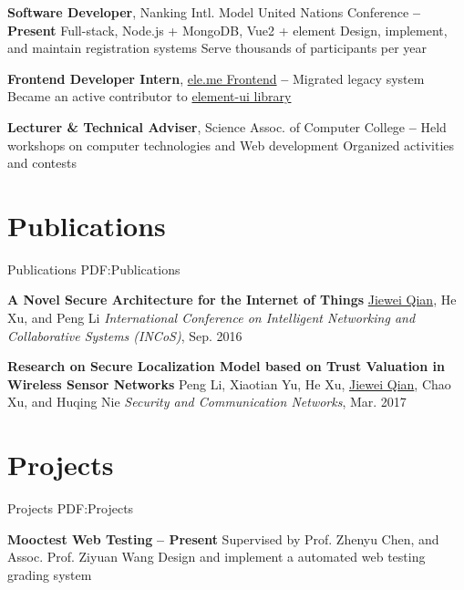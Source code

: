 \documentclass[a4paper,MMMyyyy,nonstop]{simpleresumecv}
\begin{document}
\begin{body}
\textbf{Software Developer}, Nanking Intl. Model United Nations Conference
\hfill \textbf{
      -- Present
}
\SubItem
Full-stack, Node.js + MongoDB, Vue2 + element
\SubItem
Design, implement, and maintain registration systems
\SubItem
Serve thousands of participants per year

\GapNoBreak

\textbf{Frontend Developer Intern}, \href{https://zhuanlan.zhihu.com/ElemeFE}{ele.me Frontend}
\hfill \textbf{
     -- 
}
\SubItem Migrated legacy system
\SubItem Became an active contributor to \href{https://github.com/ElemeFE/element-ui/}{element-ui library}

\GapNoBreak

\textbf{Lecturer \& Technical Adviser}, Science Assoc. of Computer College
\hfill \textbf{
     -- 
}
\SubItem
Held workshops on computer technologies and Web development
\SubItem
Organized activities and contests


\section
{Publications}
{Publications}
{PDF:Publications}

\textbf{A Novel Secure Architecture for the Internet of Things} \newline
\underline{Jiewei Qian}, He Xu, and Peng Li \newline
\textit{International Conference on Intelligent Networking and Collaborative Systems (INCoS)}, Sep. 2016

\Gap
\textbf{Research on Secure Localization Model based on Trust Valuation in Wireless Sensor Networks} \newline
Peng Li, Xiaotian Yu, He Xu, \underline{Jiewei Qian}, Chao Xu, and Huqing Nie\newline
\textit{Security and Communication Networks}, Mar. 2017


\section
{Projects}
{Projects}
{PDF:Projects}

\textbf{Mooctest Web Testing}
\hfill \textbf{  -- Present }
\SubItem
Supervised by Prof. Zhenyu Chen, and  Assoc. Prof. Ziyuan Wang
\SubItem
Design and implement a automated web testing grading system
\GapNoBreak


\end{body}
\end{document}
